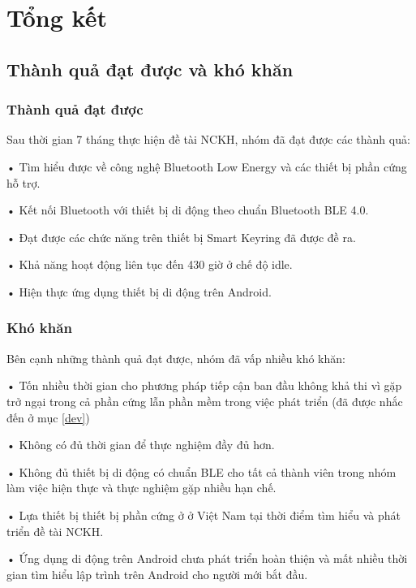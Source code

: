 \chapter{Tổng kết}

\ifpdf
    \graphicspath{{Chapter4/Figs/Raster/}{Chapter4/Figs/PDF/}{Chapter4/Figs/}}
\else
    \graphicspath{{Chapter4/Figs/Vector/}{Chapter4/Figs/}}
\fi
\section{Thành quả đạt được và khó khăn}
\subsection{Thành quả đạt được}
Sau thời gian 7 tháng thực hiện đề tài NCKH, nhóm đã đạt được các thành quả:

• Tìm hiểu được về công nghệ Bluetooth Low Energy và các thiết bị phần cứng hỗ trợ.

• Kết nối Bluetooth với thiết bị di động theo chuẩn Bluetooth BLE 4.0.

• Đạt được các chức năng trên thiết bị Smart Keyring đã được đề ra.

• Khả năng hoạt động liên tục đến 430 giờ ở chế độ idle.

• Hiện thực ứng dụng thiết bị di động trên Android.

\subsection{Khó khăn}

Bên cạnh những thành quả đạt được, nhóm đã vấp nhiều khó khăn:

• Tốn nhiều thời gian cho phương pháp tiếp cận ban đầu không khả thi vì gặp trở ngại trong cả phần cứng lẫn phần mềm trong việc phát triển (đã được nhắc đến ở mục \ref{dev})

• Không có đủ thời gian để thực nghiệm đầy đủ hơn.

• Không đủ thiết bị di động có chuẩn BLE cho tất cả thành viên trong nhóm làm việc hiện thực và thực nghiệm gặp nhiều hạn chế.

• Lựa thiết bị thiết bị phần cứng ở ở Việt Nam tại thời điểm tìm hiểu và phát triển đề tài NCKH.

• Ứng dụng di động trên Android chưa phát triển hoàn thiện và mất nhiều thời gian tìm hiểu lập trình trên Android cho người mới bắt đầu.

